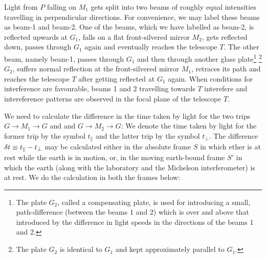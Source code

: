 Light from $P$ falling on $M_1$ gets split into two beams of 
rough\-ly equal intensities travelling in perpendicular 
directions. For convenience, we may label these beams as 
beam-1 and beam-2.  One of the beams, which we have labelled 
as  beam-2, is reflected upwards at $G_1$, falls on a flat 
front-silvered mirror $M_2$, gets reflected down, passes 
through $G_1$ again and eventually reaches the telescope 
$T$. The other beam, namely beam-1, passes through $G_1$ and 
then through another glass plate\footnote{The plate $G_2$, 
called a compensating plate, is used for introducing a 
small, path-difference (between the beams 1 and 2) which is 
over and above that  introduced by the difference in light 
speeds in the directions of the beams 1 and 2.}
\footnote{The plate $G_2$ is identical to $G_1$ and kept 
approximately parallel to $G_1$.} $G_2$,  suffers normal 
reflection at the front-silvered mirror $M_1$, retraces its 
path and reaches the telescope $T$ after getting reflected 
at $G_1$ again. When conditions for interference are 
favourable,  beams 1 and 2  travelling towards $T$ 
interefere and intereference patterns are observed in the 
focal plane of the telescope $T$.

We need to calculate the difference in the time taken by 
light for the two trips $G\rightarrow M_1\rightarrow G$ and 
and $G\rightarrow  M_2\rightarrow G$: We denote the time 
taken by light for the former trip by the symbol 
$t_\parallel$ and the latter trip by the symbol $t_\perp$. 
The difference ${\delta} t\equiv t_\parallel-t_\perp$ may be 
calculated either in the absolute frame $S$ in which ether 
is at rest while the earth is in motion, or,  in the moving 
earth-bound frame $S'$ in which the earth (along with the 
laboratory and the Michelson interferometer) is at rest. We 
do the calculation in both the frames below:

\vspace{-.2cm}

